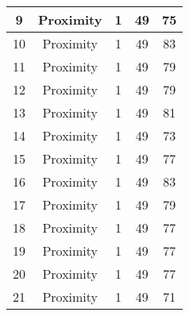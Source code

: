 \documentclass[results.tex]{subfiles}
\begin{document}
\begin{center}
\begin{tabular}{| c || c | c | c | c |}
            \hline
            9                       & Proximity                    & 1                      & 49                      & 75                   \\
            \hline
            10                      & Proximity                    & 1                      & 49                      & 83                   \\
            \hline
            11                      & Proximity                    & 1                      & 49                      & 79                   \\
            \hline
            12                      & Proximity                    & 1                      & 49                      & 79                   \\
            \hline
            13                      & Proximity                    & 1                      & 49                      & 81                   \\
            \hline
            14                      & Proximity                    & 1                      & 49                      & 73                   \\
            \hline
            15                      & Proximity                    & 1                      & 49                      & 77                   \\
            \hline
            16                      & Proximity                    & 1                      & 49                      & 83                   \\
            \hline
            17                      & Proximity                    & 1                      & 49                      & 79                   \\
            \hline
            18                      & Proximity                    & 1                      & 49                      & 77                   \\
            \hline
            19                      & Proximity                    & 1                      & 49                      & 77                   \\
            \hline
            20                      & Proximity                    & 1                      & 49                      & 77                   \\
            \hline
            21                      & Proximity                    & 1                      & 49                      & 71                   \\

\end{tabular}
\end{center}
\end{document}
